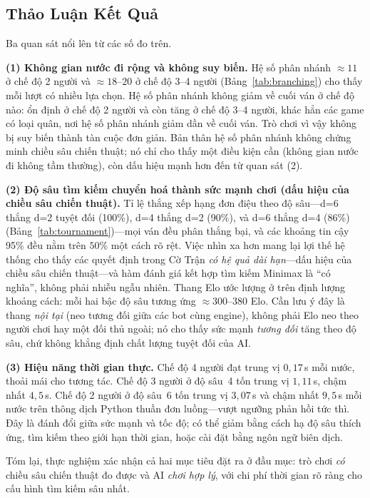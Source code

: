 \subsection{Thảo Luận Kết Quả}
\label{sec:eval_discussion}

Ba quan sát nổi lên từ các số đo trên.

\textbf{(1) Không gian nước đi rộng và không suy biến.} Hệ số phân nhánh
$\approx 11$ ở chế độ 2 người và $\approx 18$--$20$ ở chế độ 3--4 người
(Bảng~\ref{tab:branching}) cho thấy mỗi lượt có nhiều lựa chọn. Hệ số phân
nhánh không giảm về cuối ván ở chế độ nào: ổn định ở chế độ 2 người và còn tăng ở
chế độ 3--4 người, khác hẳn các game có loại quân, nơi hệ số phân nhánh
giảm dần về cuối ván. Trò chơi vì vậy không bị suy biến thành tàn cuộc đơn giản. Bản
thân hệ số phân nhánh không chứng minh chiều sâu chiến thuật; nó chỉ cho
thấy một điều kiện cần (không gian nước đi không tầm thường), còn dấu hiệu
mạnh hơn đến từ quan sát (2).

\textbf{(2) Độ sâu tìm kiếm chuyển hoá thành sức mạnh chơi (dấu hiệu của
chiều sâu chiến thuật).} Tỉ lệ thắng xếp hạng đơn điệu theo độ sâu---d=6 thắng
d=2 tuyệt đối (100\%), d=4 thắng d=2 (90\%), và d=6 thắng d=4 (86\%)
(Bảng~\ref{tab:tournament})---mọi ván đều phân thắng bại, và các
khoảng tin cậy 95\% đều nằm trên $50\%$ một cách rõ rệt. Việc nhìn xa hơn
mang lại lợi thế hệ thống cho thấy các quyết định trong Cờ Trận
\emph{có hệ quả dài hạn}---dấu hiệu của chiều sâu chiến thuật---và hàm đánh
giá kết hợp tìm kiếm Minimax là ``có nghĩa'', không phải nhiễu ngẫu nhiên.
Thang Elo ước lượng ở trên định lượng khoảng cách: mỗi hai bậc độ sâu
tương ứng $\approx 300$--$380$ Elo. Cần lưu ý đây là thang \emph{nội tại}
(neo tương đối giữa các bot cùng engine), không phải Elo neo theo người
chơi hay một đối thủ ngoài; nó cho thấy sức mạnh \emph{tương đối} tăng
theo độ sâu, chứ không khẳng định chất lượng tuyệt đối của AI.

\textbf{(3) Hiệu năng thời gian thực.} Chế độ 4 người đạt trung vị
$0{,}17$\,s mỗi nước, thoải mái cho tương tác. Chế độ 3 người ở độ sâu~4
tốn trung vị $1{,}11$\,s, chậm nhất $4{,}5$\,s. Chế độ 2 người ở độ sâu~6
tốn trung vị $3{,}07$\,s và chậm nhất $9{,}5$\,s mỗi nước trên thông dịch
Python thuần đơn luồng---vượt ngưỡng phản hồi tức thì. Đây là đánh đổi giữa
sức mạnh và tốc độ; có thể giảm bằng cách hạ độ sâu thích ứng, tìm kiếm
theo giới hạn thời gian, hoặc cài đặt bằng ngôn ngữ biên dịch.

Tóm lại, thực nghiệm xác nhận cả hai mục tiêu đặt ra ở đầu mục: trò chơi
\emph{có} chiều sâu chiến thuật đo được và AI \emph{chơi hợp lý}, với chi
phí thời gian rõ ràng cho cấu hình tìm kiếm sâu nhất.
